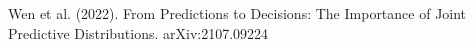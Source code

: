 \documentclass[preview]{standalone}
\begin{document}
Wen et al. (2022). From Predictions to Decisions: The Importance of Joint Predictive Distributions. arXiv:2107.09224\\
\end{document}

